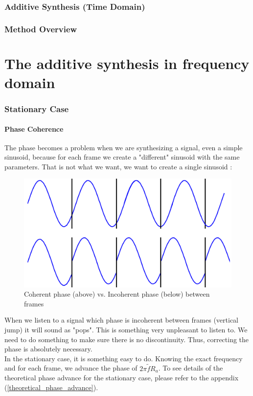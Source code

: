 \documentclass[]{article}
\begin{document}
\section{Additive Synthesis (Time Domain)}\label{sec:additive-synthesis-(time-domain)}
\section{Method Overview}\label{sec:method-overview}

\newpage
\part{The additive synthesis in frequency domain}

\section{Stationary Case}
\subsection{Phase Coherence}\label{stationary-case}
The phase becomes a problem when we are synthesizing a signal, even a simple sinusoid, because for each frame we create a "different" sinusoid with the same parameters. That is not what we want, we want to create a single sinusoid : 
	\begin{figure} [H]
	\centering
	\includegraphics[scale = 0.2]{coherentphase.png}
	\caption {Coherent phase (above) vs. Incoherent phase (below) between frames}
	\end{figure}
 When we listen to a signal which phase is incoherent between frames (vertical jump) it will sound as "pops".  This is something very unpleasant to listen to. We need to do something to make sure there is no discontinuity. Thus, correcting the phase is absolutely necessary. \\
In the stationary case, it is something easy to do. Knowing the exact frequency and for each frame, we advance the phase of $2\pi \tilde{f} R_a$. To see details of the theoretical phase advance for the stationary case, please refer to the appendix (\ref{theoretical_phase_advance}).
\end{document}
